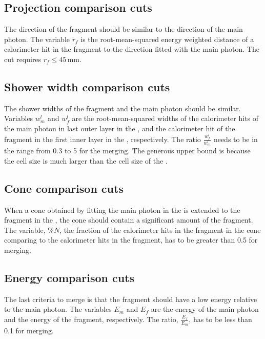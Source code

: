 \subsection{Projection comparison cuts}

The direction of the fragment should be similar to the direction of the main photon. The variable  $r_f$ is the root-mean-squared energy weighted distance of a calorimeter hit in the fragment to the direction fitted with the main photon.  The cut requires $ r_f \leqslant 45\,\text{mm}$.

\subsection{Shower width comparison cuts}

The shower widths of the fragment and the main photon should be similar. Variables $w^l_m$ and $w^l_f$ are the root-mean-squared widths of the calorimeter hits of the main photon in last outer layer  in the \ECAL, and the calorimeter hit of the fragment in the first inner layer  in the \HCAL, respectively. The ratio $\frac{w^l_f}{w^l_m}$ needs to be in the range from 0.3 to 5 for the merging. The generous upper bound is because the \HCAL cell size is much larger than the cell size of the \ECAL.

\subsection{Cone comparison cuts}

When a cone obtained by fitting the main photon in the \ECAL is extended to the fragment in the \HCAL, the cone should contain a significant amount of the fragment. The variable, $\%{N}$, the fraction of the calorimeter hits in the fragment in the cone comparing to the  calorimeter hits in the fragment, has to be greater than 0.5 for merging.

\subsection{Energy comparison cuts}


The last criteria to merge is that the fragment should have a low energy relative to the main photon. The variables $E_m$ and $E_f$ are the energy of the main photon  and the energy of the fragment, respectively. The ratio, $\frac{E_f}{E_m}$, has to be less than 0.1 for merging.




